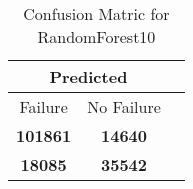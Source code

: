 \begin{table}[] 
\caption{Confusion Matric for RandomForest10} 
\label{Table: Prediction Accuracy-DMDRandomForest10OnlySunEKF-combinationReflectionEKF-top2-Reflection} 
\centering 
\begin{tabular} 
 {@{}ccc@{}} 
\toprule 
\multicolumn{2}{c}{\textbf{Predicted}}
 \\ \midrule 
\multicolumn{1}{|c|}{Failure} & 
\multicolumn{1}{c|}{No Failure}
 \\ \midrule 
\multicolumn{1}{|c|}{\color{green}\textbf{101861}} & 
\multicolumn{1}{c|}{\color{red}\textbf{14640}}
 \\ \midrule 
\multicolumn{1}{|c|}{\color{red}\textbf{18085}} & 
\multicolumn{1}{c|}{\color{green}\textbf{35542}}
 \\ \bottomrule 
\end{tabular} 
\end{table} 
